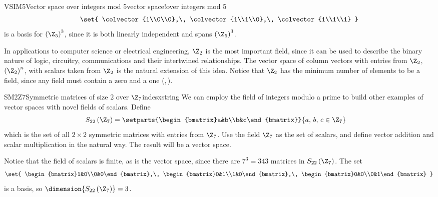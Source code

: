 \begin{example}{VSIM5}{Vector space over integers mod 5}{vector space!over integers mod 5}
%
\begin{align*}
\set{
\colvector{1\\0\\0},\,
\colvector{1\\1\\0},\,
\colvector{1\\1\\1}
}
\end{align*}
%
is a basis for $\left(\Z_5\right)^3$, since it is both linearly independent and spans $\left(\Z_5\right)^3$.
%
\end{example}
%
In applications to computer science or electrical engineering, $\Z_2$ is the most important field, since it can be used to describe the binary nature of logic, circuitry, communications and their intertwined relationships.  The vector space of column vectors with entries from $\Z_2$, $\left(\Z_2\right)^n$, with scalars taken from $\Z_2$ is the natural extension of this idea.  Notice that $\Z_2$ has the minimum number of elements to be a field, since any field must contain a zero and a one (,\,).\par
%
%
\begin{example}{SM2Z7}{Symmetric matrices of size 2 over $\Z_7$}{indesxstring}
We can employ the field of integers modulo a prime to build other examples of vector spaces with novel fields of scalars.  Define
%
\begin{align*}
S_{22}\left(\Z_7\right)
&=
\setparts{\begin{bmatrix}a&b\\b&c\end{bmatrix}}{a,\,b,\,c\in\Z_7}
\end{align*}
%
which is the set of all $2\times 2$ symmetric matrices with entries from $\Z_7$.  Use the field $\Z_7$ as the set of scalars, and define vector addition and scalar multiplication in the natural way.  The result will be a vector space.\par
%
Notice that the field of scalars is finite, as is the vector space, since there are $7^3=343$ matrices in $S_{22}\left(\Z_7\right)$.
%
The set
%
\begin{align*}
\set{
\begin{bmatrix}1&0\\0&0\end{bmatrix},\,
\begin{bmatrix}0&1\\1&0\end{bmatrix},\,
\begin{bmatrix}0&0\\0&1\end{bmatrix}
}
\end{align*}
%
is a basis, so $\dimension{S_{22}\left(\Z_7\right)}=3$.
%
\end{example}
